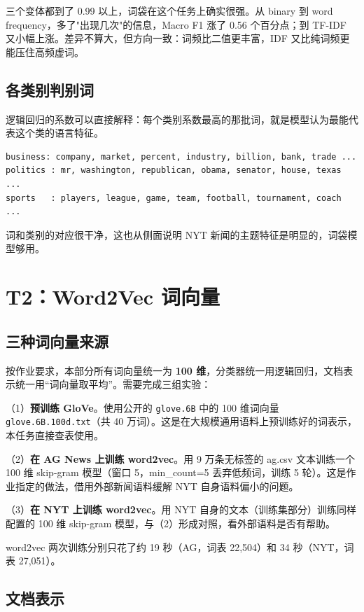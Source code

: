 \documentclass[UTF8,a4paper,10pt]{ctexart}
\begin{document}
三个变体都到了 0.99 以上，词袋在这个任务上确实很强。从 binary 到 word frequency，多了"出现几次"的信息，Macro F1 涨了 0.56 个百分点；到 TF-IDF 又小幅上涨。差异不算大，但方向一致：词频比二值更丰富，IDF 又比纯词频更能压住高频虚词。

\subsection{各类别判别词}

逻辑回归的系数可以直接解释：每个类别系数最高的那批词，就是模型认为最能代表这个类的语言特征。

\begin{lstlisting}[frame=single,numbers=none]
business: company, market, percent, industry, billion, bank, trade ...
politics : mr, washington, republican, obama, senator, house, texas ...
sports   : players, league, game, team, football, tournament, coach ...
\end{lstlisting}

词和类别的对应很干净，这也从侧面说明 NYT 新闻的主题特征是明显的，词袋模型够用。

\section{T2：Word2Vec 词向量}

\subsection{三种词向量来源}

按作业要求，本部分所有词向量统一为 \textbf{100 维}，分类器统一用逻辑回归，文档表示统一用“词向量取平均”。需要完成三组实验：

（1）\textbf{预训练 GloVe}。使用公开的 \texttt{glove.6B} 中的 100 维词向量 \texttt{glove.6B.100d.txt}（共 40 万词）。这是在大规模通用语料上预训练好的词表示，本任务直接查表使用。

（2）\textbf{在 AG News 上训练 word2vec}。用 9 万条无标签的 ag.csv 文本训练一个 100 维 skip-gram 模型（窗口 5，min\_count=5 丢弃低频词，训练 5 轮）。这是作业指定的做法，借用外部新闻语料缓解 NYT 自身语料偏小的问题。

（3）\textbf{在 NYT 上训练 word2vec}。用 NYT 自身的文本（训练集部分）训练同样配置的 100 维 skip-gram 模型，与（2）形成对照，看外部语料是否有帮助。

word2vec 两次训练分别只花了约 19 秒（AG，词表 22,504）和 34 秒（NYT，词表 27,051）。

\subsection{文档表示}
\end{document}
